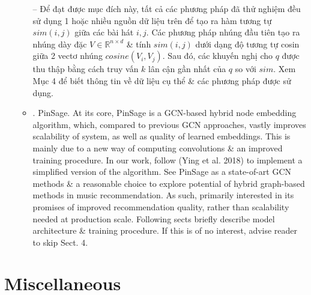 \documentclass{article}
\begin{document}
\begin{itemize}
\begin{itemize}
        -- Để đạt được mục đích này, tất cả các phương pháp đã thử nghiệm đều sử dụng 1 hoặc nhiều nguồn dữ liệu trên để tạo ra hàm tương tự $sim(i,j)$ giữa các bài hát $i,j$. Các phương pháp nhúng đầu tiên tạo ra nhúng dày đặc $V\in\mathbb{R}^{n\times d}$ \& tính $sim(i,j)$ dưới dạng độ tương tự cosin giữa 2 vectơ nhúng $cosine(V_i,V_j)$. Sau đó, các khuyến nghị cho $q$ được thu thập bằng cách truy vấn $k$ lân cận gần nhất của $q$ so với $sim$. Xem Mục 4 để biết thông tin về dữ liệu cụ thể \& các phương pháp được sử dụng.
        \item {. PinSage.} At its core, PinSage is a GCN-based hybrid node embedding algorithm, which, compared to previous GCN approaches, vastly improves scalability of system, as well as quality of learned embeddings. This is mainly due to a new way of computing convolutions \& an improved training procedure. In our work, follow (Ying et al. 2018) to implement a simplified version of the algorithm. See PinSage as a state-of-art GCN methods \& a reasonable choice to explore potential of hybrid graph-based methods in music recommendation. As such, primarily interested in its promises of improved recommendation quality, rather than scalability needed at production scale. Following sects briefly describe model architecture \& training procedure. If this is of no interest, advise reader to skip Sect. 4.
    \end{itemize}
\end{itemize}



\section{Miscellaneous}


\printbibliography[heading=bibintoc]
\end{document}
